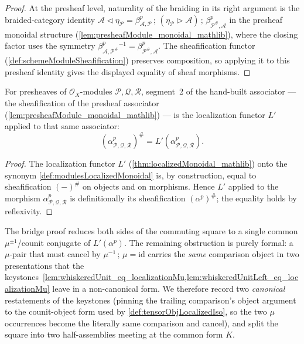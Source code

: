 \begin{proof}
  At the presheaf level, naturality of the braiding in its right argument is the
  braided-category identity
  \(\mathcal{A} \lhd \eta_{\mathcal{P}}
    = \beta^p_{\mathcal{A},\mathcal{P}} \,;\,
      (\eta_{\mathcal{P}} \rhd \mathcal{A}) \,;\,
      \beta^p_{\mathcal{P}^{\#},\mathcal{A}}\)
  in the presheaf monoidal structure
  (\cref{lem:presheafModule_monoidal_mathlib}), where the closing factor uses the
  symmetry \(\beta^p_{\mathcal{A},\mathcal{P}^{\#}}{}^{-1} =
  \beta^p_{\mathcal{P}^{\#},\mathcal{A}}\). The sheafification functor
  (\cref{def:schemeModuleSheafification}) preserves composition, so applying it to
  this presheaf identity gives the displayed equality of sheaf morphisms.
\end{proof}

\begin{lemma}
  \label{lem:sheafificationMapIso_assoc_eq_localized}
  For presheaves of \(\mathcal{O}_X\)-modules \(\mathcal{P}, \mathcal{Q},
  \mathcal{R}\), segment~2 of the hand-built associator --- the sheafification of
  the presheaf associator (\cref{lem:presheafModule_monoidal_mathlib}) --- is the
  localization functor \(L'\) applied to that same associator:
  \[
    (\alpha^p_{\mathcal{P},\mathcal{Q},\mathcal{R}})^{\#}
      = L'(\alpha^p_{\mathcal{P},\mathcal{Q},\mathcal{R}}).
  \]
\end{lemma}

\begin{proof}
  The localization functor \(L'\)
  (\cref{thm:localizedMonoidal_mathlib}) onto the synonym
  \cref{def:modulesLocalizedMonoidal} is, by construction, equal to sheafification
  \((-)^{\#}\) on objects and on morphisms. Hence \(L'\) applied to the morphism
  \(\alpha^p_{\mathcal{P},\mathcal{Q},\mathcal{R}}\) is definitionally its
  sheafification \((\alpha^p)^{\#}\); the equality holds by reflexivity.
\end{proof}

The bridge proof reduces both sides of the commuting square to a single common
\(\mu^{\pm1}\)/counit conjugate of \(L'(\alpha^p)\). The remaining obstruction is
purely formal: a \(\mu\)-pair that must cancel by \(\mu^{-1}\,;\,\mu = \mathrm{id}\)
carries the \emph{same} comparison object in two presentations that the
keystones~\cref{lem:whiskeredUnit_eq_localizationMu,lem:whiskeredUnitLeft_eq_localizationMu}
leave in a non-canonical form. We therefore record two \emph{canonical} restatements
of the keystones (pinning the trailing comparison's object argument to the
counit-object form used by \cref{def:tensorObjLocalizedIso}, so the two \(\mu\)
occurrences become the literally same comparison and cancel), and split the square
into two half-assemblies meeting at the common form \(K\).

